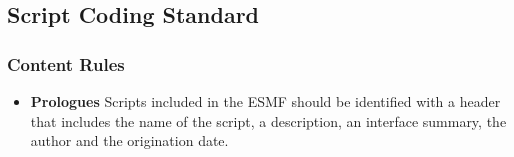 
\subsection{Script Coding Standard}

\subsubsection{Content Rules}

\begin{itemize}

\item {\bf Prologues} Scripts included in the ESMF should be identified 
with a header that includes the name of the script, a description, an 
interface summary, the author and the origination date.

\end{itemize}




